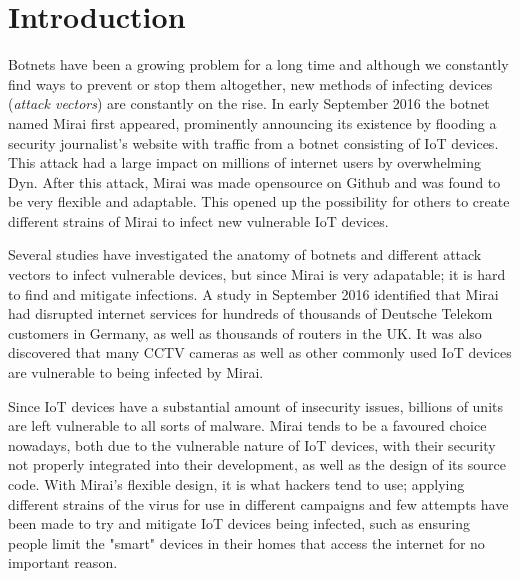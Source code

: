 \chapter{Introduction}

\begin{flushleft}

	Botnets have been a growing problem for a long time and although we constantly find ways to prevent
	or stop them altogether, new methods of infecting devices (\textit{attack vectors}) are constantly on the rise.
	In early September 2016 the botnet named Mirai first appeared, prominently announcing its
	existence by flooding a security journalist's website with traffic from a botnet consisting
	of IoT devices. This attack had a large impact on millions of internet users by overwhelming
	Dyn. After this attack, Mirai was made opensource on Github and was found to be very flexible and adaptable. This opened up the possibility for others to create different strains of Mirai to infect new vulnerable IoT devices.

	\vspace{0.5cm}

	Several studies have investigated the anatomy of botnets and different attack vectors to
	infect vulnerable devices, but since Mirai is very adapatable; it is hard to find and
	mitigate infections.
	A study in September 2016 identified that Mirai had disrupted internet services for hundreds
	of thousands of Deutsche Telekom customers in Germany, as well as thousands of routers in the UK.
	It was also discovered that many CCTV cameras as well as other commonly used IoT devices are
	vulnerable to being infected by Mirai.

	\vspace{0.5cm}

	Since IoT devices have a substantial amount of insecurity issues, billions of units are left vulnerable to all sorts of malware. Mirai tends to be a favoured choice nowadays, both due to the vulnerable nature of IoT devices, with their security not properly integrated into their development, as well as the design of its source code. With Mirai's flexible design, it is what hackers tend to use; applying different strains of the virus for use in different campaigns and few attempts have been made to try and mitigate IoT devices being infected, such as ensuring people limit the "smart" devices in their homes that access the internet for no important reason.

	\vspace{0.5cm}


\end{flushleft}
